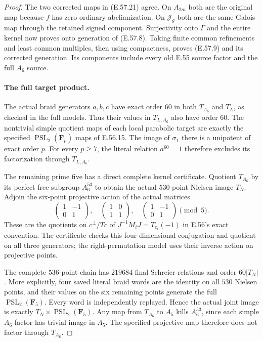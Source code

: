 \begin{proof}
The two corrected maps in
\textup{(E.57.21)} agree.  On $A_{2m}$
both are the original map because $f$ has
zero ordinary abelianization.  On
$\mathcal J_g$ both are the same Galois
map through the retained signed component.
Surjectivity onto $\Gamma$ and the entire
kernel now proves onto generation of
\textup{(E.57.8)}.  Taking finite common
refinements and least common multiples,
then using compactness, proves
\textup{(E.57.9)} and its corrected generation.
Its components include every old E.55
source factor and the full $A_6$ source.

\paragraph{The full target product.}
The actual braid generators $a,b,c$ have
exact order $60$ in both $T_{A_6}$ and
$T_L$, as checked in the full models.
Thus their values in $T_{L,A_6}$ also
have order $60$.  The nontrivial simple
quotient maps of each local parabolic
target are exactly the specified
$\operatorname{PSL}_2(\mathbf F_p)$ maps
of E.56.15.  The image of $\sigma_1$
there is a unipotent of exact order $p$.
For every $p\ge7$, the literal relation
$a^{60}=1$ therefore excludes its
factorization through $T_{L,A_6}$.

The remaining prime five has a direct
complete kernel certificate.  Quotient
$T_{A_6}$ by its perfect free subgroup
$A_6^{53}$ to obtain the actual $530$-point
Nielsen image $T_N$.  Adjoin the six-point
projective action of the actual matrices
\[
       \begin{pmatrix}1&-1\\0&1\end{pmatrix},
       \quad\begin{pmatrix}1&0\\1&1\end{pmatrix},
       \quad\begin{pmatrix}1&-1\\0&1\end{pmatrix}
                                      \pmod5.
 \tag{E.57.22}
\]
These are the quotients on $c^\perp/Tc$
of $J^{-1}M_iJ=T_{e_i}(-1)$ in E.56's
exact convention.  The certificate checks
this four-dimensional conjugation and
quotient on all three generators; the
right-permutation model uses their inverse
action on projective points.

The complete $536$-point chain has
$219684$ final Schreier relations and
order $60|T_N|$.  More explicitly, four
saved literal braid words are the identity
on all $530$ Nielsen points, and their
values on the six remaining points
generate the full $\operatorname{PSL}_2(\mathbf F_5)$.
Every word is independently replayed.
Hence the actual joint image is exactly
$T_N\times\operatorname{PSL}_2(\mathbf F_5)$.
Any map from $T_{A_6}$ to $A_5$ kills
$A_6^{53}$, since each simple $A_6$
factor has trivial image in $A_5$.
The specified projective map therefore
does not factor through $T_{A_6}$.


\end{proof}
